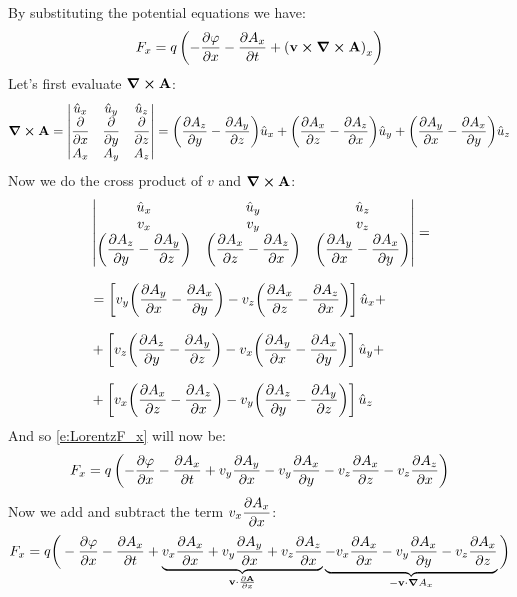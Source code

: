 By substituting the potential equations we have:
\begin{equation} \label{e:LorentzF_x}
  F_x = q \brackets{-\pdv{\potE}{x} - \pdv{A_x}{t} + \brackets{\vec{v} \cross \curl{\vec{A}}}_x}
\end{equation}
Let's first evaluate $\curl{\vb{A}}$:
\begin{equation}
  \curl{\vec{A}} =
  \begin{vmatrix}
  \hat{u}_x & \hat{u}_y & \hat{u}_z \\
  \pdv{}{x} & \pdv{}{y} & \pdv{}{z} \\
  A_x & A_y & A_z
  \end{vmatrix}
  = \bbrackets{\pdv{A_z}{y} - \pdv{A_y}{z}}\hat{u}_x
  + \bbrackets{\pdv{A_x}{z} - \pdv{A_z}{x}}\hat{u}_y
  + \bbrackets{\pdv{A_y}{x} - \pdv{A_x}{y}}\hat{u}_z
\end{equation}
Now we do the cross product of $v$ and $\curl{\vb{A}}$:
\begin{equation}
  \begin{split}
    &\begin{vmatrix}
      \hat{u}_x & \hat{u}_y & \hat{u}_z \\
      v_x & v_y & v_z \\
      \bbrackets{\pdv{A_z}{y} - \pdv{A_y}{z}} & \bbrackets{\pdv{A_x}{z} - \pdv{A_z}{x}} & \bbrackets{\pdv{A_y}{x} - \pdv{A_x}{y}}
    \end{vmatrix}
    = \\[8pt]
      &= \sqbr{v_y \bbrackets{\pdv{A_y}{x} - \pdv{A_x}{y}} - v_z \bbrackets{\pdv{A_x}{z} - \pdv{A_z}{x}}}\hat{u}_x +\\[8pt]
      &+ \sqbr{v_z \bbrackets{\pdv{A_z}{y} - \pdv{A_y}{z}} - v_x \bbrackets{\pdv{A_y}{x} - \pdv{A_x}{y}}}\hat{u}_y +\\[8pt]
      &+ \sqbr{v_x \bbrackets{\pdv{A_x}{z} - \pdv{A_z}{x}} - v_y \bbrackets{\pdv{A_z}{y} - \pdv{A_y}{z}}}\hat{u}_z
  \end{split}
\end{equation}
And so \eqref{e:LorentzF_x} will now be:
\begin{equation}
  F_x = q \brackets{-\pdv{\potE}{x} - \pdv{A_x}{t} + v_y \pdv{A_y}{x} - v_y\pdv{A_x}{y} - v_z \pdv{A_x}{z} - v_z\pdv{A_z}{x}}
\end{equation}
Now we add and subtract the term $v_x \pdv{A_x}{x}$:
\begin{equation}
  F_x = q \bigg(-\pdv{\potE}{x} - \pdv{A_x}{t} + \underbrace{v_x \pdv{A_x}{x} + v_y \pdv{A_y}{x} + v_z\pdv{A_z}{x}}_{\vec{v}\cdot \frac{\partial \vec{A}}{\partial x}} \underbrace{- v_x \pdv{A_x}{x}- v_y\pdv{A_x}{y} - v_z \pdv{A_x}{z}}_{-\vec{v} \cdot \grad{A_x}} \bigg)
\end{equation}
